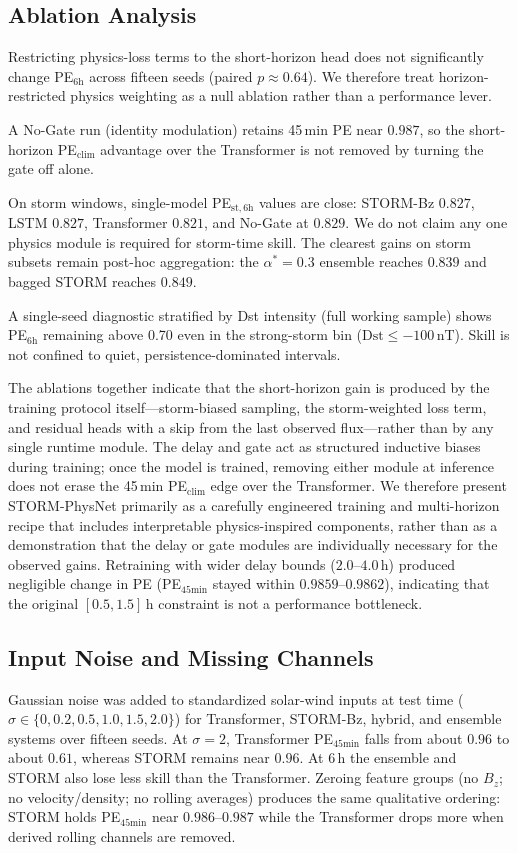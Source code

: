 \documentclass[conference]{IEEEtran}
\begin{document}
\subsection{Ablation Analysis}
Restricting physics-loss terms to the short-horizon head does not
significantly change PE\(_{6\mathrm{h}}\) across fifteen seeds (paired
\(p\approx0.64\)). We therefore treat horizon-restricted physics weighting
as a null ablation rather than a performance lever.

A No-Gate run (identity modulation) retains 45\,min PE near
\(0.987\), so the short-horizon PE\(_{\mathrm{clim}}\) advantage over
the Transformer is not removed by turning the gate off alone.

On storm windows, single-model PE\(_{\mathrm{st},6\mathrm{h}}\) values
are close: STORM-Bz \(0.827\), LSTM \(0.827\), Transformer \(0.821\),
and No-Gate at \(0.829\). We do not claim any one physics
module is required for storm-time skill. The clearest gains on storm
subsets remain post-hoc aggregation: the \(\alpha^*=0.3\) ensemble
reaches \(0.839\) and bagged STORM reaches \(0.849\).

A single-seed diagnostic stratified by Dst intensity (full working
sample) shows PE\(_{6\mathrm{h}}\) remaining above 0.70 even in the
strong-storm bin (\(\mathrm{Dst}\le-100\,\mathrm{nT}\)). Skill is not
confined to quiet, persistence-dominated intervals.

The ablations together indicate that the short-horizon gain is produced by the training protocol itself---storm-biased sampling, the storm-weighted loss term, and residual heads with a skip from the last observed flux---rather than by any single runtime module. The delay and gate act as structured inductive biases during training; once the model is trained, removing either module at inference does not erase the 45\,min PE\(_{\mathrm{clim}}\) edge over the Transformer. We therefore present STORM-PhysNet primarily as a carefully engineered training and multi-horizon recipe that includes interpretable physics-inspired components, rather than as a demonstration that the delay or gate modules are individually necessary for the observed gains. Retraining with wider delay bounds ($2.0$--$4.0$\,h) produced negligible change in PE (PE$_{45\mathrm{min}}$ stayed within $0.9859$--$0.9862$), indicating that the original $[0.5, 1.5]$\,h constraint is not a performance bottleneck.

\subsection{Input Noise and Missing Channels}
Gaussian noise was added to standardized solar-wind inputs at test time
(\(\sigma\in\{0,0.2,0.5,1.0,1.5,2.0\}\)) for Transformer, STORM-Bz,
hybrid, and ensemble systems over fifteen seeds.
At \(\sigma=2\), Transformer PE\(_{45\mathrm{min}}\) falls from about
\(0.96\) to about \(0.61\), whereas STORM remains near \(0.96\).
At 6\,h the ensemble and STORM also lose less skill than the Transformer.
Zeroing feature groups (no \(B_z\); no velocity/density; no rolling
averages) produces the same qualitative ordering: STORM holds
PE\(_{45\mathrm{min}}\) near \(0.986\mbox{--}0.987\) while the Transformer drops more
when derived rolling channels are removed.
\end{document}
